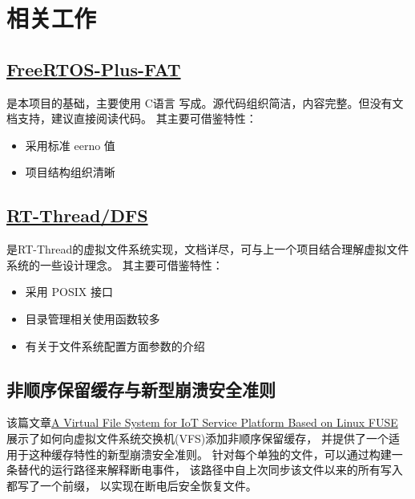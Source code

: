 \documentclass[UTF8,a4paper]{ctexart}
\begin{document}
\section{相关工作}
\subsection{\href{https://www.freertos.org/zh-cn-cmn-s/FreeRTOS-Plus/FreeRTOS_Plus_FAT/index.html}{FreeRTOS-Plus-FAT}}
是本项目的基础，主要使用 C语言 写成。源代码组织简洁，内容完整。但没有文档支持，建议直接阅读代码。
其主要可借鉴特性：
\begin{itemize}
    \item 采用标准 eerno 值
    \item 项目结构组织清晰
\end{itemize}
\subsection{\href{https://www.rt-thread.org/document/site/\#/rt-thread-version/rt-thread-standard/programming-manual/filesystem/filesystem}{RT-Thread/DFS}}
是RT-Thread的虚拟文件系统实现，文档详尽，可与上一个项目结合理解虚拟文件系统的一些设计理念。
其主要可借鉴特性：
\begin{itemize}
    \item 采用 POSIX 接口
    \item 目录管理相关使用函数较多
    \item 有关于文件系统配置方面参数的介绍
\end{itemize}

\subsection{非顺序保留缓存与新型崩溃安全准则}
该篇文章\href{run:./ref/Modular Integration of Crashsafe Caching into a Verified Virtual File System Switch.pdf}{A Virtual File System for IoT Service Platform Based on Linux FUSE}
展示了如何向虚拟文件系统交换机(VFS)添加非顺序保留缓存，
并提供了一个适用于这种缓存特性的新型崩溃安全准则。
针对每个单独的文件，可以通过构建一条替代的运行路径来解释断电事件，
该路径中自上次同步该文件以来的所有写入都写了一个前缀，
以实现在断电后安全恢复文件。
\end{document}
